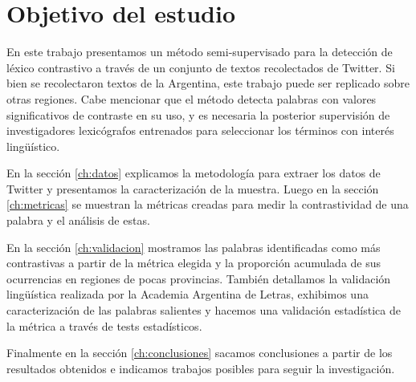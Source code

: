 
\section{Objetivo del estudio}

En este trabajo presentamos un método semi-supervisado para la detección de léxico contrastivo a través de un conjunto de textos recolectados de Twitter. Si bien se recolectaron textos de la Argentina, este trabajo puede ser replicado sobre otras regiones. Cabe mencionar que el método detecta palabras con valores significativos de contraste en su uso, y es necesaria la posterior supervisión de investigadores lexicógrafos entrenados para seleccionar los términos con interés lingüístico.

En la sección \ref{ch:datos} explicamos la metodología para extraer los datos de Twitter y presentamos la caracterización de la muestra. 
Luego en la sección \ref{ch:metricas} se muestran la métricas creadas para medir la contrastividad de una palabra y el análisis de estas.

En la sección \ref{ch:validacion} mostramos las palabras identificadas como más contrastivas a partir de la métrica elegida y la proporción acumulada de sus ocurrencias en regiones de pocas provincias. 
También detallamos la validación lingüística realizada por la Academia Argentina de Letras, exhibimos una caracterización de las palabras salientes y hacemos una validación estadística de la métrica a través de tests estadísticos. 

Finalmente en la sección \ref{ch:conclusiones} sacamos conclusiones a partir de los resultados obtenidos e indicamos trabajos posibles para seguir la investigación.

